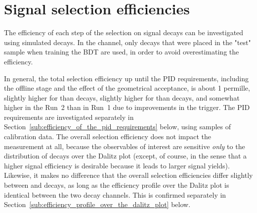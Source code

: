 
\FloatBarrier
\section{Signal selection efficiencies} %
\label{sec:signal_selection_efficiencies}




The efficiency of each step of the selection on signal decays can be investigated using simulated decays. In the \BtoDpi channel, only decays that were placed in the "test" sample when training the BDT are used, in order to avoid overestimating the efficiency. 

In general, the total selection efficiency up until the PID requirements, including the offline stage and the effect of the geometrical \lhcb acceptance, is about 1 permille, slightly higher for \BtoDK than \BtoDpi decays, slightly higher for \DtoKsKK than \DtoKspipi decays, and somewhat higher in the Run~2 than in Run~1 due to improvements in the trigger. The PID requirements are investigated separately in Section~\ref{sub:efficiency_of_the_pid_requirements} below, using samples of calibration data. The overall selection efficiency does not impact the measurement at all, because the observables of interest are sensitive  \emph{only} to the distribution of decays over the Dalitz plot (except, of course, in the sense that a higher signal efficiency is desirable because it leads to larger signal yields). Likewise, it makes no difference that the overall selection efficiencies differ slightly between \BtoDK and \BtoDpi decays, as long as the efficiency profile over the Dalitz plot is identical between the two decay channels. This is confirmed separately in Section~\ref{sub:efficiency_profile_over_the_dalitz_plot} below.

